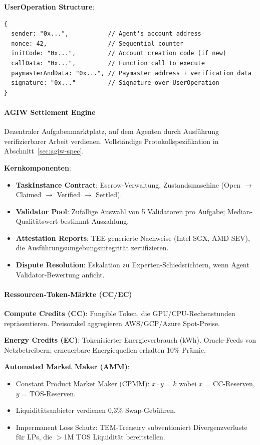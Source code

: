 \documentclass[11pt]{article}
\begin{document}
\textbf{UserOperation Structure}:
\begin{verbatim}
{
  sender: "0x...",           // Agent's account address
  nonce: 42,                 // Sequential counter
  initCode: "0x...",         // Account creation code (if new)
  callData: "0x...",         // Function call to execute
  paymasterAndData: "0x...", // Paymaster address + verification data
  signature: "0x..."         // Signature over UserOperation
}
\end{verbatim}

\paragraph{AGIW Settlement Engine}
Dezentraler Aufgabenmarktplatz, auf dem Agenten durch Ausführung verifizierbarer Arbeit verdienen. Vollständige Protokollspezifikation in Abschnitt~\ref{sec:agiw-spec}.

\textbf{Kernkomponenten}:
\begin{itemize}[noitemsep]
  \item \textbf{TaskInstance Contract}: Escrow-Verwaltung, Zustandsmaschine (Open $\to$ Claimed $\to$ Verified $\to$ Settled).
  \item \textbf{Validator Pool}: Zufällige Auswahl von 5 Validatoren pro Aufgabe; Median-Qualitätswert bestimmt Auszahlung.
  \item \textbf{Attestation Reports}: TEE-generierte Nachweise (Intel SGX, AMD SEV), die Ausführungsumgebungsintegrität zertifizieren.
  \item \textbf{Dispute Resolution}: Eskalation zu Experten-Schiedsrichtern, wenn Agent Validator-Bewertung anficht.
\end{itemize}

\paragraph{Ressourcen-Token-Märkte (CC/EC)}
\textbf{Compute Credits (CC)}: Fungible Token, die GPU/CPU-Rechenstunden repräsentieren. Preisorakel aggregieren AWS/GCP/Azure Spot-Preise.

\textbf{Energy Credits (EC)}: Tokenisierter Energieverbrauch (kWh). Oracle-Feeds von Netzbetreibern; erneuerbare Energiequellen erhalten 10\% Prämie.

\textbf{Automated Market Maker (AMM)}:
\begin{itemize}[noitemsep]
  \item Constant Product Market Maker (CPMM): $x \cdot y = k$ wobei $x$ = CC-Reserven, $y$ = TOS-Reserven.
  \item Liquiditätsanbieter verdienen 0,3\% Swap-Gebühren.
  \item Impermanent Loss Schutz: TEM-Treasury subventioniert Divergenzverluste für LPs, die $>$1M TOS Liquidität bereitstellen.
\end{itemize}
\end{document}
